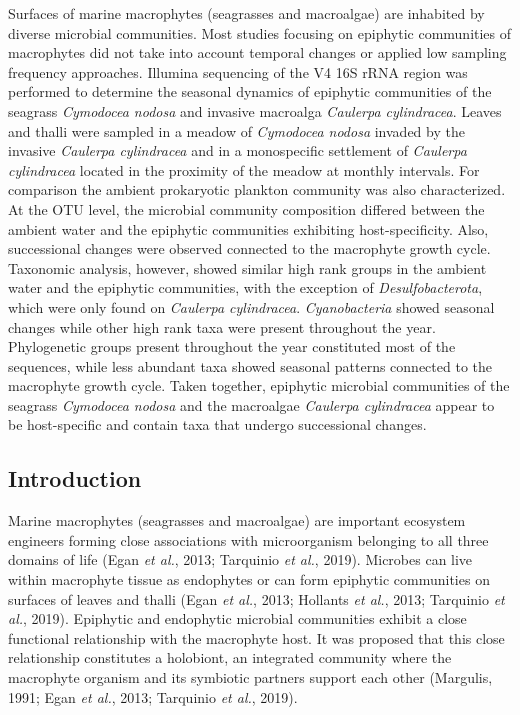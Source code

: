 \documentclass[12pt,]{article}
\begin{document}
Surfaces of marine macrophytes (seagrasses and macroalgae) are inhabited
by diverse microbial communities. Most studies focusing on epiphytic
communities of macrophytes did not take into account temporal changes or
applied low sampling frequency approaches. Illumina sequencing of the V4
16S rRNA region was performed to determine the seasonal dynamics of
epiphytic communities of the seagrass \emph{Cymodocea nodosa} and
invasive macroalga \emph{Caulerpa cylindracea}. Leaves and thalli were
sampled in a meadow of \emph{Cymodocea nodosa} invaded by the invasive
\emph{Caulerpa cylindracea} and in a monospecific settlement of
\emph{Caulerpa cylindracea} located in the proximity of the meadow at
monthly intervals. For comparison the ambient prokaryotic plankton
community was also characterized. At the OTU level, the microbial
community composition differed between the ambient water and the
epiphytic communities exhibiting host-specificity. Also, successional
changes were observed connected to the macrophyte growth cycle.
Taxonomic analysis, however, showed similar high rank groups in the
ambient water and the epiphytic communities, with the exception of
\emph{Desulfobacterota}, which were only found on \emph{Caulerpa
cylindracea}. \emph{Cyanobacteria} showed seasonal changes while other
high rank taxa were present throughout the year. Phylogenetic groups
present throughout the year constituted most of the sequences, while
less abundant taxa showed seasonal patterns connected to the macrophyte
growth cycle. Taken together, epiphytic microbial communities of the
seagrass \emph{Cymodocea nodosa} and the macroalgae \emph{Caulerpa
cylindracea} appear to be host-specific and contain taxa that undergo
successional changes.

\newpage

\hypertarget{introduction}{%
\subsection{Introduction}\label{introduction}}

Marine macrophytes (seagrasses and macroalgae) are important ecosystem
engineers forming close associations with microorganism belonging to all
three domains of life (Egan \emph{et al.}, 2013; Tarquinio \emph{et
al.}, 2019). Microbes can live within macrophyte tissue as endophytes or
can form epiphytic communities on surfaces of leaves and thalli (Egan
\emph{et al.}, 2013; Hollants \emph{et al.}, 2013; Tarquinio \emph{et
al.}, 2019). Epiphytic and endophytic microbial communities exhibit a
close functional relationship with the macrophyte host. It was proposed
that this close relationship constitutes a holobiont, an integrated
community where the macrophyte organism and its symbiotic partners
support each other (Margulis, 1991; Egan \emph{et al.}, 2013; Tarquinio
\emph{et al.}, 2019).
\end{document}
